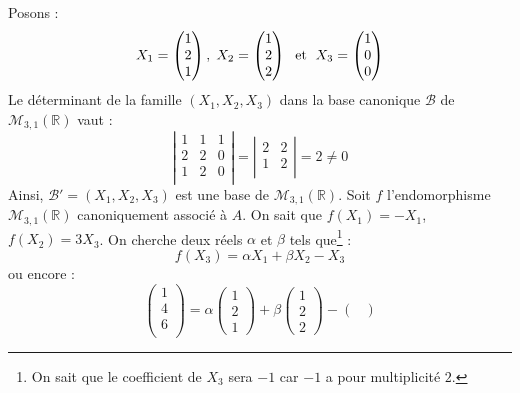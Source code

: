 \documentclass[a4paper,10pt]{report}
\begin{document}
\begin{enumerate}
\medskip

\noindent Posons :
$$ X_1 = \begin{pmatrix}
1 \\
2 \\
1 \\
\end{pmatrix}, \; X_2 = \begin{pmatrix}
1 \\
2 \\
2 \\
\end{pmatrix} \; \hbox{ et } \; X_3=\begin{pmatrix}
1 \\
0 \\
0 \\
\end{pmatrix}$$
Le déterminant de la famille $(X_1, X_2,X_3)$ dans la base canonique $\mathcal{B}$ de $\mathcal{M}_{3,1}(\mathbb{R})$ vaut :
$$ \left\vert \begin{array}{ccc}
1 & 1 & 1 \\
2 & 2 & 0 \\
1 & 2 & 0 \\
\end{array}\right\vert = \left\vert \begin{array}{cc}
2 & 2 \\
1 & 2  \\
\end{array}\right\vert = 2 \neq 0$$
Ainsi, $\mathcal{B}'=(X_1, X_2, X_3)$ est une base de $\mathcal{M}_{3,1}(\mathbb{R})$. Soit $f$ l'endomorphisme $\mathcal{M}_{3,1}(\mathbb{R})$ canoniquement associé à $A$. On sait que $f(X_1)=-X_1$, $f(X_2)=3X_3$. On cherche deux réels $\alpha$ et $\beta$ tels que\footnote{On sait que le coefficient de $X_3$ sera $-1$ car $-1$ a pour multiplicité $2$.} :
$$ f(X_3) = \alpha X_1 + \beta X_2 - X_3$$
ou encore :
$$ \begin{pmatrix}
1 \\
4 \\
6 \\
\end{pmatrix} = \alpha \begin{pmatrix}
1 \\
2 \\
1
\end{pmatrix} + \beta \begin{pmatrix}
1 \\
2 \\
2
\end{pmatrix} -  \begin{pmatrix}

\end{pmatrix}$$
\end{enumerate}
\end{document}
